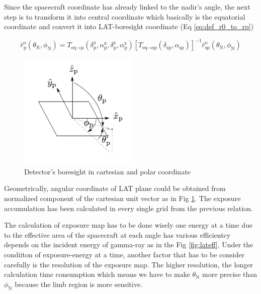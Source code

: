 Since the spacecraft coordinate has already linked to the nadir's angle, the next step is to transform it into central coordinate which basically is the equatorial coordinate and convert it into LAT-boresight coordinate (Eq \ref{eq:def_r0_to_rp})

\begin{equation}
    \hat{r}^\text{o}_\text{p} (\theta_\text{N}, \phi_\text{N}) = T_{\text{eq}\rightarrow\text{p}} (\delta^\text{x}_\text{p}, \alpha^\text{x}_\text{p}, \delta^\text{z}_\text{p}, \alpha^\text{z}_\text{p}) \left[T_{\text{eq}\rightarrow\text{sp}} (\delta_\text{sp}, \alpha_\text{sp})\right]^{-1} \hat{r}^\text{o}_\text{sp} (\theta_\text{N}, \phi_\text{N})
    \label{eq:def_r0_to_rp}
\end{equation}

\begin{figure}[h!]
    \centering
    \includegraphics[width=0.5\textwidth]{img/fig_coordinate/coord_plane.pdf}
    \caption{Detector's boresight in cartesian and polar coordinate}
    \label{fig:tf_lat_pol_car}
\end{figure}

Geometrically, angular coordinate of LAT plane could be obtained from normalized component of the cartesian unit vector as in Fig \ref{fig:tf_lat_pol_car}.
The exposure accumulation has been calculated in every single grid from the previous relation.

The calculation of exposure map has to be done wisely one energy at a time
due to the effective area of the spacecraft at each angle has various efficientcy depends on the incident energy of gamma-ray as in the Fig \ref{fig:lateff}.
Under the condiiton of exposure-energy at a time, another factor that has to be consider carefully is the resolution of the exposure map.
The higher resolution, the longer calculation time consumption which means we have to make $\theta_\text{N}$ more precise than $\phi_\text{N}$ because the limb region is more sensitive.

